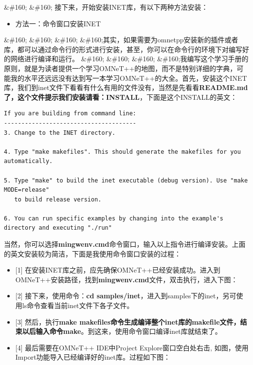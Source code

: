 \&\#160; \&\#160; 接下来，开始安装INET库，有以下两种方法安装：

\begin{itemize}
\item 方法一：命令窗口安装INET

\end{itemize}

\&\#160; \&\#160; \&\#160; \&\#160;其实，如果需要为omnetpp安装新的插件或者库，都可以通过命令行的形式进行安装，甚至，你可以在命令行的环境下对编写好的网络进行编译和运行。
\&\#160; \&\#160; \&\#160; \&\#160;我编写这个学习手册的原则，就是为读者提供一个学习OMNeT++的地图，而不是特别详细的字典，可能我的水平还远远没有达到写一本学习OMNeT++的大全。首先，安装这个INET库，我们到inet文件下看看有什么有用的文件没有，当然是先看看\textbf{README.md\textbf{了，这个文件提示我们安装请看：}INSTALL}，下面是这个INSTALL的英文：

\begin{verbatim}
If you are building from command line:
--------------------------------------
3. Change to the INET directory.

4. Type "make makefiles". This should generate the makefiles for you automatically.

5. Type "make" to build the inet executable (debug version). Use "make MODE=release"
   to build release version.

6. You can run specific examples by changing into the example's directory and executing "./run"

\end{verbatim}

当然，你可以选择\textbf{mingwenv.cmd}命令窗口，输入以上指令进行编译安装。上面的英文安装较为简洁，下面是我使用命令窗口安装的过程：

\begin{itemize}
\item {[1]} 在安装INET库之前，应先确保OMNeT++已经安装成功。进入到OMNeT++安装路径，找到\textbf{mingwenv.cmd}文件，双击执行，进入下图：

\end{itemize}

\begin{itemize}
\item {[2]} 接下来，使用命令：\textbf{cd samples\slash inet}，进入到samples下的inet，另可使用ls命令查看当前inet文件下各子文件。

\item {[3]} 然后，执行\textbf{make makefiles\textbf{命令生成编译整个inet库的makefile文件，结束以后输入命令}make}。到这来，使用命令窗口编译inet库就结束了。

\item {[4]} 最后需要在OMNeT++ IDE中Project Explore窗口空白处右击, 如图，使用Import功能导入已经编译好的inet库。过程如下图：

\end{itemize}



